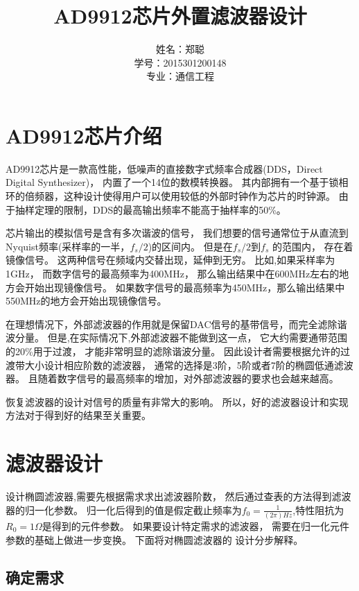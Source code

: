 \documentclass{article}
\begin{document}
\begin{CJK}{UTF8}{gbsn}

\title{AD9912芯片外置滤波器设计}
\author{姓名：郑聪\\
学号：2015301200148 \\
专业：通信工程}
\maketitle

\section{AD9912芯片介绍}
\qquad AD9912芯片是一款高性能，低噪声的直接数字式频率合成器(DDS，Direct Digital Synthesizer)， 
内置了一个14位的数模转换器。
其内部拥有一个基于锁相环的倍频器，这种设计使得用户可以使用较低的外部时钟作为芯片的时钟源。 
由于抽样定理的限制，DDS的最高输出频率不能高于抽样率的50\%。

芯片输出的模拟信号是含有多次谐波的信号， 
我们想要的信号通常位于从直流到Nyquist频率(采样率的一半，\(f_s/2\))的区间内。
但是在\(f_s/2\)到\(f_s\) 的范围内，
存在着镜像信号。
这两种信号在频域内交替出现，延伸到无穷。
比如,如果采样率为1GHz，
而数字信号的最高频率为400MHz，
那么输出结果中在600MHz左右的地方会开始出现镜像信号。
如果数字信号的最高频率为450MHz，那么输出结果中550MHz的地方会开始出现镜像信号。

在理想情况下，外部滤波器的作用就是保留DAC信号的基带信号，而完全滤除谐波分量。
但是,在实际情况下,外部滤波器不能做到这一点，
它大约需要通带范围的20\%用于过渡，
才能非常明显的滤除谐波分量。
因此设计者需要根据允许的过渡带大小设计相应阶数的滤波器，
通常的选择是3阶，5阶或者7阶的椭圆低通滤波器。
且随着数字信号的最高频率的增加，对外部滤波器的要求也会越来越高。

恢复滤波器的设计对信号的质量有非常大的影响。
所以，好的滤波器设计和实现方法对于得到好的结果至关重要。

\section{滤波器设计}
\qquad 设计椭圆滤波器,需要先根据需求求出滤波器阶数，
然后通过查表的方法得到滤波器的归一化参数。 
归一化后得到的值是假定截止频率为\(f_0=\frac{1}{(2 \pi )Hz}\),特性阻抗为\(R_0=1 \Omega \)是得到的元件参数。
如果要设计特定需求的滤波器，
需要在归一化元件参数的基础上做进一步变换。
下面将对椭圆滤波器的 设计分步解释。

\subsection{确定需求}


\end{CJK}
\end{document}
